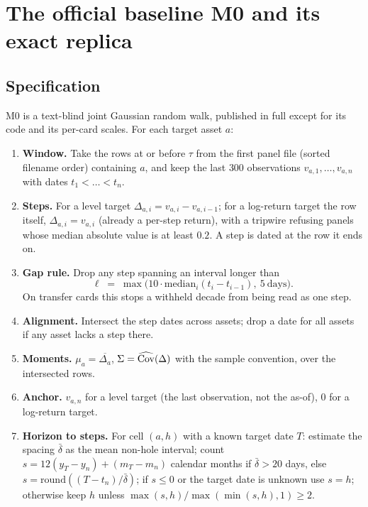 \section{The official baseline M0 and its exact replica}\label{sec:baseline}

\subsection{Specification}

M0 is a text-blind joint Gaussian random walk, published in full except for its code and its per-card scales. For each target asset $a$:

\begin{enumerate}[leftmargin=*]
\item \textbf{Window.} Take the rows at or before $\tau$ from the first panel file (sorted filename order) containing $a$, and keep the
last $300$ observations $v_{a,1},\dots,v_{a,n}$ with dates $t_1<\dots<t_n$.
\item \textbf{Steps.} For a level target $\Delta_{a,i}=v_{a,i}-v_{a,i-1}$; for a log-return target the row itself, $\Delta_{a,i}=v_{a,i}$
(already a per-step return), with a tripwire refusing panels whose median absolute value is at least $0.2$. A step is dated at the row it ends on.
\item \textbf{Gap rule.} Drop any step spanning an interval longer than
\begin{equation}
  \ell \;=\; \max\bigl(10\cdot\mathrm{median}_i(t_i-t_{i-1}),\ 5\ \text{days}\bigr).
\end{equation}
On transfer cards this stops a withheld decade from being read as one step.
\item \textbf{Alignment.} Intersect the step dates across assets; drop a date for all assets if any asset lacks a step there.
\item \textbf{Moments.} $\mu_a=\overline{\Delta_a}$, $\Sigma=\widehat{\operatorname{Cov}}(\Delta)$ with the sample convention, over the intersected rows.
\item \textbf{Anchor.} $v_{a,n}$ for a level target (the last observation, not the as-of), $0$ for a log-return target.
\item \textbf{Horizon to steps.} For cell $(a,h)$ with a known target date $T$: estimate the spacing $\bar\delta$ as the mean non-hole interval;
count $s=12(y_T-y_n)+(m_T-m_n)$ calendar months if $\bar\delta>20$ days, else $s=\mathrm{round}((T-t_n)/\bar\delta)$; if $s\le 0$ or the target
date is unknown use $s=h$; otherwise keep $h$ unless $\max(s,h)/\max(\min(s,h),1)\ge 2$.

\end{enumerate}
